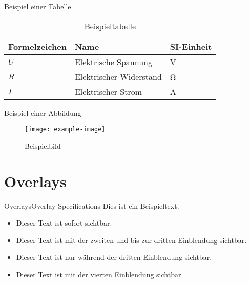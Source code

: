 \begin{frame}{Beispiel einer Tabelle}
    \begin{table}[htbp]
        \centering
        \caption{Beispieltabelle}
        \label{tab:bsp-tabelle}
        \begin{tabular}{lll}
            \toprule
            \textbf{Formelzeichen} & \textbf{Name} & \textbf{SI-Einheit} \\
            \midrule
            $U$ & Elektrische Spannung & \si{\volt} \\
            $R$ & Elektrischer Widerstand & \si{\ohm} \\
            $I$ & Elektrischer Strom & \si{\ampere} \\
            \bottomrule
        \end{tabular}
    \end{table}
\end{frame}

\begin{frame}{Beispiel einer Abbildung}
    \begin{figure}[htbp]
        \centering
        \texttt{[image: example-image]} %
        \caption{Beispielbild}
        \label{fig:bsp-bild}
    \end{figure}
\end{frame}



\section{Overlays} %

\begin{frame}{Overlays}{Overlay Specifications}
    Dies ist ein Beispieltext.

    \begin{itemize}
        \item<1-> Dieser Text ist sofort sichtbar.
        \item<2-3> Dieser Text ist mit der zweiten und bis zur dritten Einblendung sichtbar.
        \item<3> Dieser Text ist nur während der dritten Einblendung sichtbar.
        \item<4-> Dieser Text ist mit der vierten Einblendung sichtbar.
    \end{itemize}
\end{frame}

